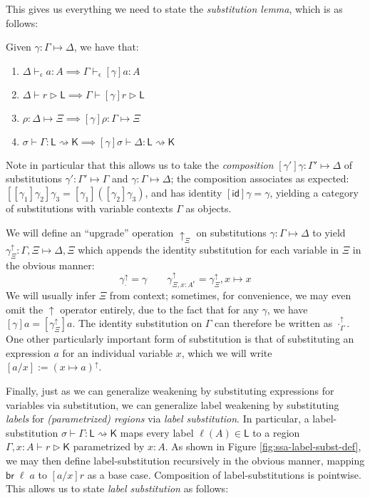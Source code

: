 \documentclass[acmsmall,screen,review]{acmart}
\newcounter{todos}
\newcommand{\todo}[1]{\stepcounter{todos} \textcolor{red}{\textbf{TODO \arabic{todos}}: #1}}
\newcommand{\ms}[1]{\ensuremath{\mathsf{#1}}}
\newcommand{\upg}[1]{{#1}^\uparrow}
\newcommand{\thyp}[3]{#1 : {#2}^{#3}}
\newcommand{\hasty}[4]{#1 \vdash_{#2} #3: {#4}}
\newcommand{\haslb}[3]{#1 \vdash #2 \rhd #3}
\newcommand{\issubst}[3]{#1: #2 \mapsto #3}
\newcommand{\lbsubst}[4]{#1 \vdash #2: #3 \rightsquigarrow #4}
\begin{document}
This gives us everything we need to state the \emph{substitution lemma}, which
is as follows:
\begin{lemma}[Substitution]
  Given $\issubst{\gamma}{\Gamma}{\Delta}$, we have that:
  \begin{enumerate}[label=(\alph*)]
    \item $\hasty{\Delta}{\epsilon}{a}{A} \implies \hasty{\Gamma}{\epsilon}{[\gamma]a}{A}$ 
    \item $\haslb{\Delta}{r}{\ms{L}} \implies \haslb{\Gamma}{[\gamma]r}{\ms{L}}$
    \item $\issubst{\rho}{\Delta}{\Xi} \implies \issubst{[\gamma]\rho}{\Gamma}{\Xi}$
    \item $\lbsubst{\sigma}{\Gamma}{\ms{L}}{\ms{K}} \implies \lbsubst{[\gamma]\sigma}{\Delta}{\ms{L}}{\ms{K}}$
  \end{enumerate}
\end{lemma}
Note in particular that this allows us to take the \emph{composition}
$\issubst{[\gamma']\gamma}{\Gamma'}{\Delta}$ of substitutions $\issubst{\gamma'}{\Gamma'}{\Gamma}$
and $\issubst{\gamma}{\Gamma}{\Delta}$; the composition associates as expected:
$[[\gamma_1]\gamma_2]\gamma_3 = [\gamma_1]([\gamma_2]\gamma_3)$, and has identity $[\ms{id}]\gamma =
\gamma$, yielding a category of substitutions with variable contexts $\Gamma$ as objects.

We will define an ``upgrade'' operation $\uparrow_\Xi$ on substitutions
$\issubst{\gamma}{\Gamma}{\Delta}$ to yield $\issubst{\upg{\gamma}_{\Xi}}{\Gamma, \Xi}{\Delta, \Xi}$
which appends the identity substitution for each variable in $\Xi$ in the obvious manner:
\begin{equation}
  \upg{\gamma}_{\cdot} = \gamma \qquad 
  \upg{\gamma}_{\Xi, \thyp{x}{A}{\epsilon}} = \upg{\gamma}_{\Xi}, x \mapsto x
\end{equation}
We will usually infer $\Xi$ from context; sometimes, for convenience, we may even omit the
$\uparrow$ operator entirely, due to the fact that for any $\gamma$, we have $[\gamma]a =
[\upg{\gamma}_\Xi]a$. The identity substitution on $\Gamma$ can therefore be written as
$\upg{\cdot}_{\Gamma}$. One other particularly important form of substitution is that of
substituting an expression $a$ for an individual variable $x$, which we will write $[a/x] := \upg{(x
\mapsto a)}$.

Finally, just as we can generalize weakening by substituting expressions for variables via
substitution, we can generalize label weakening by substituting \emph{labels} for
\emph{(parametrized) regions} via \emph{label substitution}. In particular, a label-substitution
$\lbsubst{\sigma}{\Gamma}{\ms{L}}{\ms{K}}$ maps every label $\ell(A) \in \ms{L}$ to a region
$\haslb{\Gamma, x : A}{r}{\ms{K}}$ parametrized by $x : A$. As shown in Figure
\ref{fig:ssa-label-subst-def}, we may then define label-substitution recursively in the obvious
manner, mapping $\ms{br}\;\ell\;a$ to $[a/x]r$ as a base case. Composition of label-substitutions is
pointwise. This allows us to state \emph{label substitution} as follows:
\end{document}
